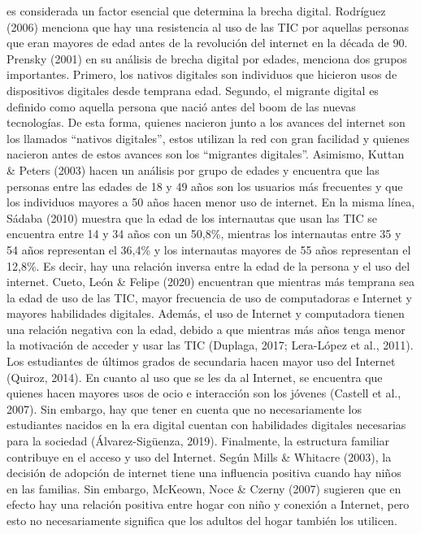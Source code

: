es considerada un factor esencial que determina la brecha digital.
Rodríguez (2006) menciona que hay una resistencia al uso de las TIC por
aquellas personas que eran mayores de edad antes de la revolución del
internet en la década de 90. Prensky (2001) en su análisis de brecha
digital por edades, menciona dos grupos importantes. Primero, los
nativos digitales son individuos que hicieron usos de dispositivos
digitales desde temprana edad. Segundo, el migrante digital es definido
como aquella persona que nació antes del boom de las nuevas tecnologías.
De esta forma, quienes nacieron junto a los avances del internet son los
llamados ``nativos digitales'', estos utilizan la red con gran facilidad
y quienes nacieron antes de estos avances son los ``migrantes
digitales''. Asimismo, Kuttan \& Peters (2003) hacen un análisis por
grupo de edades y encuentra que las personas entre las edades de 18 y 49
años son los usuarios más frecuentes y que los individuos mayores a 50
años hacen menor uso de internet. En la misma línea, Sádaba (2010)
muestra que la edad de los internautas que usan las TIC se encuentra
entre 14 y 34 años con un 50,8\%, mientras los internautas entre 35 y 54
años representan el 36,4\% y los internautas mayores de 55 años
representan el 12,8\%. Es decir, hay una relación inversa entre la edad
de la persona y el uso del internet. Cueto, León \& Felipe (2020)
encuentran que mientras más temprana sea la edad de uso de las TIC,
mayor frecuencia de uso de computadoras e Internet y mayores habilidades
digitales. Además, el uso de Internet y computadora tienen una relación
negativa con la edad, debido a que mientras más años tenga menor la
motivación de acceder y usar las TIC (Duplaga, 2017; Lera-López et al.,
2011). Los estudiantes de últimos grados de secundaria hacen mayor uso
del Internet (Quiroz, 2014). En cuanto al uso que se les da al Internet,
se encuentra que quienes hacen mayores usos de ocio e interacción son
los jóvenes (Castell et al., 2007). Sin embargo, hay que tener en cuenta
que no necesariamente los estudiantes nacidos en la era digital cuentan
con habilidades digitales necesarias para la sociedad (Álvarez-Sigüenza,
2019). Finalmente, la estructura familiar contribuye en el acceso y uso
del Internet. Según Mills \& Whitacre (2003), la decisión de adopción de
internet tiene una influencia positiva cuando hay niños en las familias.
Sin embargo, McKeown, Noce \& Czerny (2007) sugieren que en efecto hay
una relación positiva entre hogar con niño y conexión a Internet, pero
esto no necesariamente significa que los adultos del hogar también los
utilicen.

